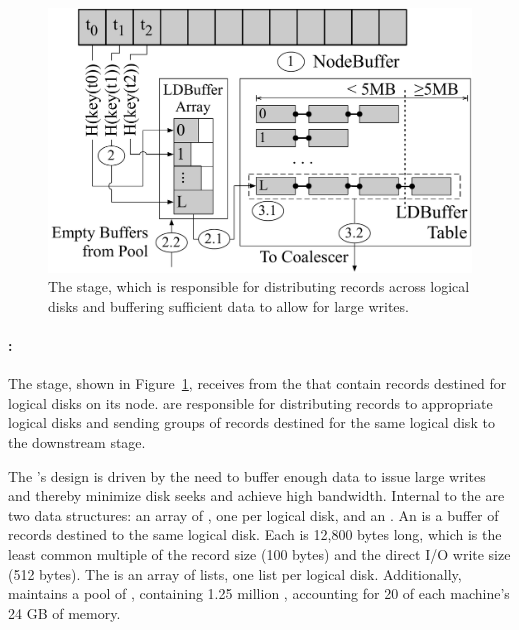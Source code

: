 \begin{figure}
  \centering
  \includegraphics[width=\columnwidth]{tritonsort/figs/ldts_stage.pdf}
  \caption{The \ldts stage, which is responsible for distributing records
  across logical disks and buffering sufficient data to allow for large writes.}
  \label{fig:ldts}
\end{figure}

\paragraph{\ldts:} The \ldts stage, shown in Figure~\ref{fig:ldts}, receives
\nodebuffers from the \receiver that contain records destined for logical disks
on its node.  \ldtss are responsible for distributing records to appropriate
logical disks and sending groups of records destined for the same logical disk to
the downstream \writer stage.

The \ldts's design is driven by the need to buffer enough data to issue large
writes and thereby minimize disk seeks and achieve high bandwidth. Internal to
the \ldts are two data structures: an array of \ldbuffers, one per logical
disk, and an \ldtable.  An \ldbuffer is a buffer of records destined to the same
logical disk.  Each \ldbuffer is 12,800 bytes long, which is the least common
multiple of the record size (100 bytes) and the direct I/O write size (512
bytes).  The \ldtable is an array of \ldbuffer lists, one list per logical disk.
Additionally, \ldts maintains a pool of \ldbuffers, containing 1.25 million
\ldbuffers, accounting for 20 of each machine's 24 GB of memory.

